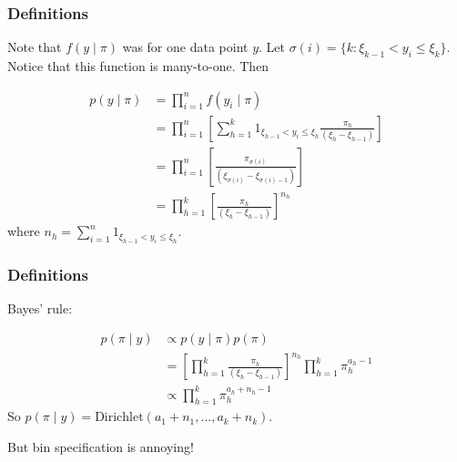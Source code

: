 \documentclass{beamer}
\begin{document}
\begin{frame}
\frametitle{Definitions}

Note that $f(y \mid \pi)$ was for one data point $y$. Let $\sigma(i) = \{k : \xi_{k-1} < y_i \le \xi_{k} \}$. Notice that this function is many-to-one. Then

\begin{align*}
p(y \mid \pi)  &= \prod_{i=1}^n f(y_i \mid \pi) \\
&= \prod_{i=1}^n\left[ \sum_{h=1}^k 1_{\xi_{h-1} < y_i \le \xi_{h} } \frac{\pi_h}{(\xi_{h} - \xi_{h-1})} \right] \\
&= \prod_{i=1}^n\left[  \frac{\pi_{\sigma(i)} }{(\xi_{\sigma(i)} - \xi_{\sigma(i)-1}  )} \right] \\
&= \prod_{h=1}^k \left[  \frac{\pi_{h} }{(\xi_{h} - \xi_{h-1}  )} \right] ^{n_h}
\end{align*}  
where $n_h = \sum_{i=1}^n 1_{\xi_{h-1} < y_i \le \xi_{h} }$.
\end{frame}

\begin{frame}
\frametitle{Definitions}

Bayes' rule:

\begin{align*}
p(\pi \mid y) &\propto p(y \mid \pi) p(\pi) \\
&= \left[\prod_{h=1}^k   \frac{\pi_{h} }{(\xi_{h} - \xi_{h-1}  )} \right] ^{n_h}\prod_{h=1}^k \pi_h^{a_h-1} \\
&\propto \prod_{h=1}^k \pi_h^{a_h+n_h-1}
\end{align*}
So $p(\pi \mid y) = \text{Dirichlet}(a_1 + n_1, \ldots, a_k + n_k)$.
\pause
\newline

But bin specification is annoying!
\end{frame}
\end{document}

